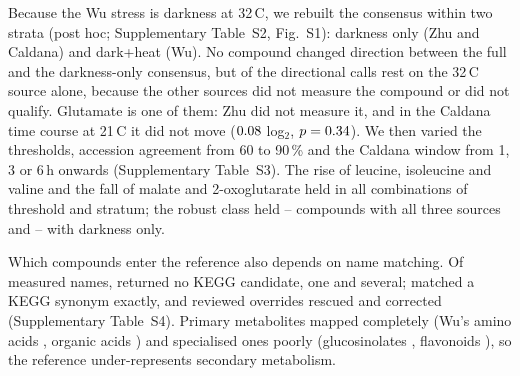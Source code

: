 \documentclass{npjlayout}
\begin{document}
Because the Wu stress is darkness at 32\,\textdegree C, we rebuilt the consensus within two strata
(post hoc; Supplementary Table~S2, Fig.~S1): darkness only (Zhu and Caldana) and dark+heat (Wu). No
compound changed direction between the full and the darkness-only consensus, but \nDarkHeatOnly{}
of the \nDirectional{} directional calls rest on the 32\,\textdegree C source alone, because the
other sources did not measure the compound or did not qualify. Glutamate is one of them: Zhu did not
measure it, and in the Caldana time course at 21\,\textdegree C it did not move ($0.08$
log$_2$, $p = 0.34$). We then varied the thresholds, accession agreement from 60 to 90\,\%
and the Caldana window from 1, 3 or 6\,h onwards (Supplementary Table~S3). The rise of leucine,
isoleucine and valine and the fall of malate and 2-oxoglutarate held in all \nGridRows{}
combinations of threshold and stratum; the robust class held \robustAllMin--\robustAllMax{}
compounds with all three sources and \robustDarkMin--\robustDarkMax{} with darkness only.

Which compounds enter the reference also depends on name matching. Of \nKeggNames{} measured names,
\nKeggZero{} returned no KEGG candidate, \nKeggOne{} one and \nKeggMulti{} several; \nKeggRule{}
matched a KEGG synonym exactly, and reviewed overrides rescued \nOverRescued{} and corrected
\nOverCorrected{} (Supplementary Table~S4). Primary metabolites mapped completely (Wu's amino acids
\wuClassAminoAcid, organic acids \wuClassOrganicAcid) and specialised ones poorly (glucosinolates
\wuClassGlucosinolate, flavonoids \wuClassFlavonoid), so the reference under-represents secondary
metabolism.
\end{document}
